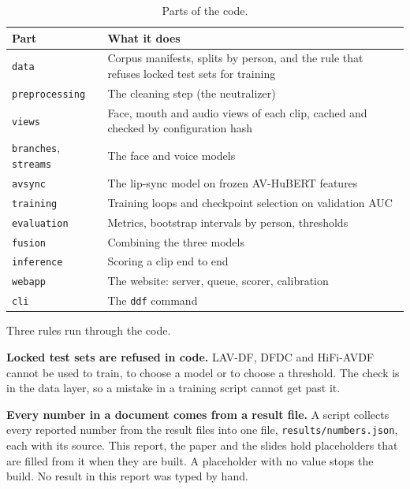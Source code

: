 \begin{table}[ht]
    \centering
    \small
    \caption{Parts of the code.}
    \label{tab:packages}
    \begin{tabularx}{\textwidth}{@{}l >{\raggedright\arraybackslash}X@{}}
        \toprule
        \textbf{Part} & \textbf{What it does} \\
        \midrule
        \texttt{data} & Corpus manifests, splits by person, and the rule that refuses locked test sets for training \\
        \texttt{preprocessing} & The cleaning step (the neutralizer) \\
        \texttt{views} & Face, mouth and audio views of each clip, cached and checked by configuration hash \\
        \texttt{branches}, \texttt{streams} & The face and voice models \\
        \texttt{avsync} & The lip-sync model on frozen AV-HuBERT features \\
        \texttt{training} & Training loops and checkpoint selection on validation AUC \\
        \texttt{evaluation} & Metrics, bootstrap intervals by person, thresholds \\
        \texttt{fusion} & Combining the three models \\
        \texttt{inference} & Scoring a clip end to end \\
        \texttt{webapp} & The website: server, queue, scorer, calibration \\
        \texttt{cli} & The \texttt{ddf} command \\
        \bottomrule
    \end{tabularx}
\end{table}

Three rules run through the code.

\textbf{Locked test sets are refused in code.} LAV-DF, DFDC and HiFi-AVDF
cannot be used to train, to choose a model or to choose a threshold. The
check is in the data layer, so a mistake in a training script cannot get past
it.

\textbf{Every number in a document comes from a result file.} A script
collects every reported number from the result files into one file,
\texttt{results/numbers.json}, each with its source. This report, the paper and
the slides hold placeholders that are filled from it when they are built. A
placeholder with no value stops the build. No result in this report was typed
by hand.

